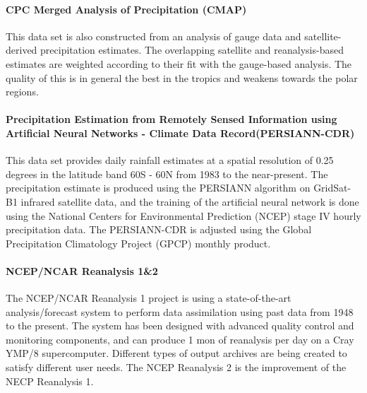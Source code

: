 \paragraph{CPC Merged Analysis of Precipitation (CMAP)}
This data set is also constructed from an analysis of gauge data and satellite-derived precipitation estimates. The overlapping satellite and reanalysis-based estimates are weighted according to their fit with the gauge-based analysis. The quality of this is in general the best in the tropics and weakens towards the polar regions. 
\paragraph{Precipitation Estimation from Remotely Sensed Information using Artificial Neural Networks - Climate Data Record(PERSIANN-CDR)}
This data set provides daily rainfall estimates at a spatial resolution of 0.25 degrees in the latitude band 60S - 60N from 1983 to the near-present. The precipitation estimate is produced using the PERSIANN algorithm on GridSat-B1 infrared satellite data, and the training of the artificial neural network is done using the National Centers for Environmental Prediction (NCEP) stage IV hourly precipitation data. The PERSIANN-CDR is adjusted using the Global Precipitation Climatology Project (GPCP) monthly product.
\paragraph{NCEP/NCAR Reanalysis 1\&2}
The NCEP/NCAR Reanalysis 1 project is using a state-of-the-art analysis/forecast system to perform data assimilation using past data from 1948 to the present. The system has been designed with advanced quality control and monitoring components, and can produce 1 mon of reanalysis per day on a Cray YMP/8 supercomputer. Different types of output archives are being created to satisfy different user needs\cite{kalnay1996ncep}. The NCEP Reanalysis 2 is the improvement of the NECP Reanalysis 1.
